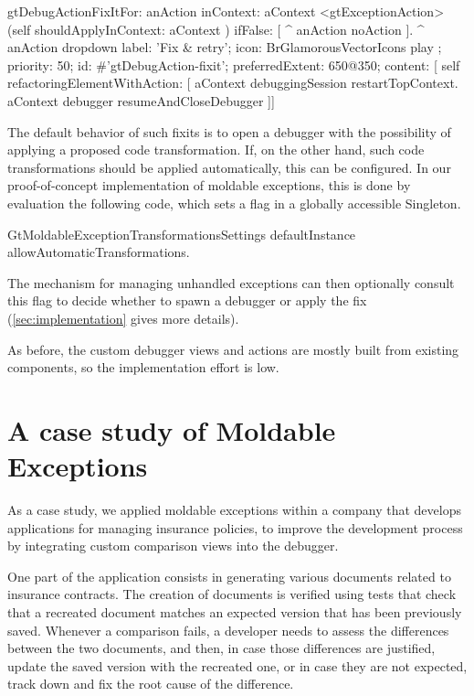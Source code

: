 \documentclass[sigplan,10pt]{acmart}
\newcommand\ac[1]{\nbc{AC}{#1}{teal}}
\begin{document}

\begin{code}
gtDebugActionFixItFor: anAction inContext: aContext
	<gtExceptionAction>
	(self shouldApplyInContext: aContext )
		ifFalse: [ ^ anAction noAction ].
	^ anAction dropdown
		label: 'Fix & retry';
		icon: BrGlamorousVectorIcons play ;
		priority: 50;
		id: #'gtDebugAction-fixit';
		preferredExtent: 650@350;
		content: [ self refactoringElementWithAction: [
			aContext debuggingSession restartTopContext.
			aContext debugger resumeAndCloseDebugger ]]
\end{code}

The default behavior of such fixits is to open a debugger with the possibility of applying a proposed code transformation.
If, on the other hand, such code transformations should be applied automatically, this can be configured.
In our proof-of-concept implementation of moldable exceptions, this is done by evaluation the following code, which sets a flag in a globally accessible Singleton.
\begin{code}
GtMoldableExceptionTransformationsSettings defaultInstance allowAutomaticTransformations.
\end{code}
The mechanism for managing unhandled exceptions can then optionally consult this flag to decide whether to spawn a debugger or apply the fix (\autoref{sec:implementation} gives more details).

As before, the custom debugger views and actions are mostly built from existing components, so the implementation effort is low.

\section{A case study of Moldable Exceptions}\label{sec:casestudy}

As a case study, we applied moldable exceptions within a company that develops applications for managing insurance policies, to improve the development process by integrating custom comparison views into the debugger.

One part of the application consists in generating various documents related to insurance contracts.
The creation of documents is verified using tests that check that a recreated document matches an expected version that has been previously saved.
Whenever a comparison fails, a developer needs to assess the differences between the two documents, and then, in case those differences are justified, update the saved version with the recreated one, or in case they are not expected, track down and fix the root cause of the difference.
\end{document}
